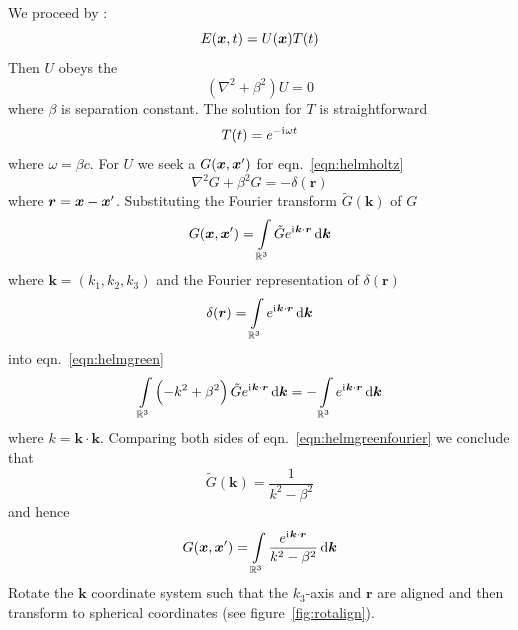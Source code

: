 We proceed by :
%
\begin{equation}
    E(\bm{x}, t) = U(\bm{x}) T(t)\label{eqn:sepvar}
\end{equation}
%
Then \(U\) obeys the 
%
\begin{equation}
    (\nabla ^{2}+\beta^{2})U=0\label{eqn:helmholtz}
\end{equation}
%
where \(\beta\) is separation constant.
%
The solution for \(T\) is straightforward
\begin{equation}
    T(t) = e^{-\mathrm{i}\mkern1mu \omega t}
\end{equation}
%
where \(\omega = \beta c\).
%
For \(U\) we seek a  \(G(\bm{x},\bm{x}')\) for eqn.~\eqref{eqn:helmholtz}
%
\begin{equation}
    \nabla^2 G + \beta^2 G = -\delta(\bm{r})\label{eqn:helmgreen}
\end{equation}
%
where \(\bm{r} = \bm{x} - \bm{x}'\).
%
Substituting the Fourier transform \(\tilde{G}(\bm{k})\) of \(G\)
%
\begin{equation}
    G(\bx, \bx') = \int\limits_{\mathbb{R}^3} \tilde{G} e^{\iu \bm{k}\cdot \bm{r}} \dif \bm{k}
\end{equation}
%
where \(\bm{k} = \left(k_1, k_2, k_3\right)\) and the Fourier representation of \(\delta(\bm{r})\)
\begin{equation}
    \delta(\bm{r}) = \int\limits_{\mathbb{R}^3} e^{\iu \bm{k} \cdot \bm{r}} \dif \bm{k}
\end{equation}
%
into eqn.~\eqref{eqn:helmgreen}
%
\begin{equation}
    \int\limits_{\mathbb{R}^3} \left(-k^2 +\beta^2 \right) \tilde{G}e^{\iu \bm{k}\cdot \bm{r}} \dif \bm{k} = - \int\limits_{\mathbb{R}^3} e^{\iu \bm{k}\cdot \bm{r}} \dif \bm{k}\label{eqn:helmgreenfourier}
\end{equation}
%
where \(k = \bm{k}\cdot\bm{k}\).
%
Comparing both sides of eqn.~\eqref{eqn:helmgreenfourier} we conclude that
%
\begin{equation}
    \tilde{G}(\bm{k}) = \frac{1}{k^2-\beta^2}
\end{equation}
%
and hence
%
\begin{equation}
    G(\bx, \bx') = \int\limits_{\mathbb{R}^3} \frac{e^{\iu \bm{k}\cdot \bm{r}}}{k^2-\beta^2}  \dif \bm{k}
\end{equation}
%
Rotate the \(\bm{k}\) coordinate system such that the \(k_3\)-axis and \(\bm{r}\) are aligned and then transform to spherical coordinates (see figure~\ref{fig:rotalign}).
